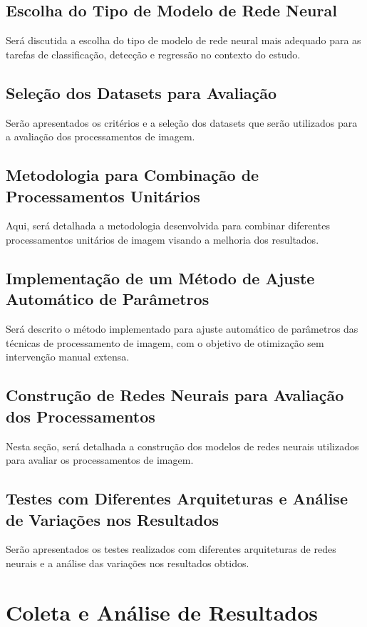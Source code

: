 \section{Escolha do Tipo de Modelo de Rede Neural}
Será discutida a escolha do tipo de modelo de rede neural mais adequado para as tarefas de classificação, detecção e regressão no contexto do estudo.

\section{Seleção dos Datasets para Avaliação}
Serão apresentados os critérios e a seleção dos datasets que serão utilizados para a avaliação dos processamentos de imagem.

\section{Metodologia para Combinação de Processamentos Unitários}
Aqui, será detalhada a metodologia desenvolvida para combinar diferentes processamentos unitários de imagem visando a melhoria dos resultados.

\section{Implementação de um Método de Ajuste Automático de Parâmetros}
Será descrito o método implementado para ajuste automático de parâmetros das técnicas de processamento de imagem, com o objetivo de otimização sem intervenção manual extensa.

\section{Construção de Redes Neurais para Avaliação dos Processamentos}
Nesta seção, será detalhada a construção dos modelos de redes neurais utilizados para avaliar os processamentos de imagem.

\section{Testes com Diferentes Arquiteturas e Análise de Variações nos Resultados}
Serão apresentados os testes realizados com diferentes arquiteturas de redes neurais e a análise das variações nos resultados obtidos.

\chapter{Coleta e Análise de Resultados}
